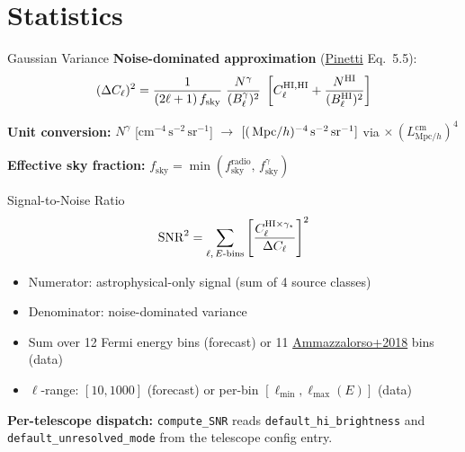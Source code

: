 \section{Statistics}

\begin{frame}{Gaussian Variance}
\textbf{Noise-dominated approximation} (\href{https://arxiv.org/abs/1911.04989}{Pinetti} Eq.~5.5):
\begin{equation}
(\Delta C_\ell)^2 = \frac{1}{(2\ell+1)\,f_{\mathrm{sky}}}\;\frac{N^\gamma}{(B_\ell^\gamma)^2}\;\left[C_\ell^{\mathrm{HI,HI}} + \frac{N^{\mathrm{HI}}}{(B_\ell^{\mathrm{HI}})^2}\right]
\end{equation}

\textbf{Unit conversion:} $N^\gamma$ [$\mathrm{cm}^{-4}\,\mathrm{s}^{-2}\,\mathrm{sr}^{-1}$] $\to$ $[(\,\mathrm{Mpc}/h)^{-4}\,\mathrm{s}^{-2}\,\mathrm{sr}^{-1}]$ via $\times\,(L_{\mathrm{Mpc}/h}^{\mathrm{cm}})^4$

\vspace{0.3cm}
\textbf{Effective sky fraction:} $f_{\mathrm{sky}} = \min(f_{\mathrm{sky}}^{\mathrm{radio}},\, f_{\mathrm{sky}}^{\gamma})$
\end{frame}

\begin{frame}{Signal-to-Noise Ratio}
\begin{equation}
\mathrm{SNR}^2 = \sum_{\ell,\,E\text{-bins}} \left[\frac{C_\ell^{\mathrm{HI}\times\gamma_\star}}{\Delta C_\ell}\right]^2
\end{equation}

\begin{itemize}
    \item Numerator: astrophysical-only signal (sum of 4 source classes)
    \item Denominator: noise-dominated variance
    \item Sum over 12 Fermi energy bins (forecast) or 11 \href{https://arxiv.org/abs/1808.09225}{Ammazzalorso+2018} bins (data)
    \item $\ell$-range: $[10, 1000]$ (forecast) or per-bin $[\ell_{\min}, \ell_{\max}(E)]$ (data)
\end{itemize}

\vspace{0.3cm}
\textbf{Per-telescope dispatch:} \texttt{compute\_SNR} reads \texttt{default\_hi\_brightness} and \texttt{default\_unresolved\_mode} from the telescope config entry.
\end{frame}

